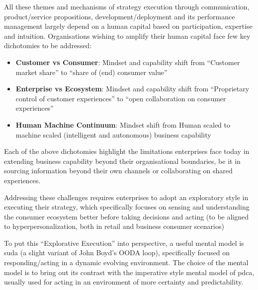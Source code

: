 All these themes and mechanisms of strategy execution through communication, product/service propositions,
development/deployment and its performance management largely depend on a human capital based on participation,
expertise and intuition.
Organisations wishing to amplify their human capital face few key dichotomies to be addressed:
\begin{itemize}
    \item \textbf{Customer vs Consumer}: Mindset and capability shift from ``Customer market share'' to
          ``share of (end) consumer value''
    \item \textbf{Enterprise vs Ecosystem}: Mindset and capability shift from
          “Proprietary control of customer experiences” to “open collaboration on consumer experiences”
    \item \textbf{Human Machine Continuum}: Mindset shift from Human scaled to machine scaled
          (intelligent and autonomous) business capability
\end{itemize}
Each of the above dichotomies highlight the limitations enterprises face today in extending business capability
beyond their organisational boundaries, be it in sourcing information beyond their own channels or collaborating
on shared experiences.

Addressing these challenges requires enterprises to adopt an exploratory style in executing their strategy,
which specifically focuses on sensing and understanding the consumer ecosystem better before taking decisions
and acting (to be aligned to hyperpersonalization, both in retail and business consumer scenarios)

To put this “Explorative Execution” into perspective, a useful mental model is \gls{suda}
(a slight variant of John Boyd’s OODA loop),
specifically focused on responding/acting in a dynamic evolving environment.
The choice of the mental model is to bring out its contrast with the imperative style mental model of \gls{pdca},
usually used for acting in an environment of more certainty and predictability.

